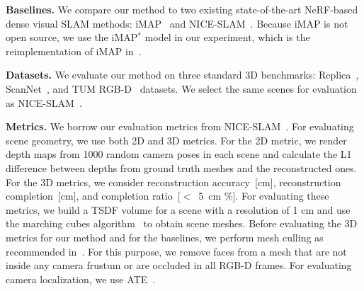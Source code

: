\vspace{1ex}
\noindent\textbf{Baselines.} We compare our method to two existing state-of-the-art NeRF-based dense visual SLAM methods: iMAP~\citep{sucar2021imap} and NICE-SLAM~\citep{zhu2022nice}. Because iMAP is not open source, we use the iMAP$^*$ model in our experiment, which is the reimplementation of iMAP in~\cite{zhu2022nice}.

\vspace{1ex}
\noindent\textbf{Datasets.} We evaluate our method on three standard 3D benchmarks: Replica~\citep{replica19arxiv}, ScanNet~\citep{dai2017scannet}, and TUM RGB-D~\citep{sturm2012benchmark} datasets. We select the same scenes for evaluation as NICE-SLAM~\citep{zhu2022nice}.

\vspace{1ex}
\noindent\textbf{Metrics.} We borrow our evaluation metrics from NICE-SLAM~\citep{zhu2022nice}. For evaluating scene geometry, we use both 2D and 3D metrics. For the 2D metric, we render depth maps from 1000 random camera poses in each scene and calculate the L1 difference between depths from ground truth meshes and the reconstructed ones. For the 3D metrics, we consider reconstruction accuracy~[cm], reconstruction completion~[cm], and completion ratio~[$<$~5~cm \%]. For evaluating these metrics, we build a TSDF volume for a scene with a resolution of 1 cm and use the marching cubes algorithm~\citep{lorensen1987marching} to obtain scene meshes. Before evaluating the 3D metrics for our method and for the baselines, we perform mesh culling as recommended in~\cite{azinovic2022neural, wang2022go}. For this purpose, we remove faces from a mesh that are not inside any camera frustum or are occluded in all RGB-D frames. For evaluating camera localization, we use ATE~\citep{sturm2012benchmark}.

